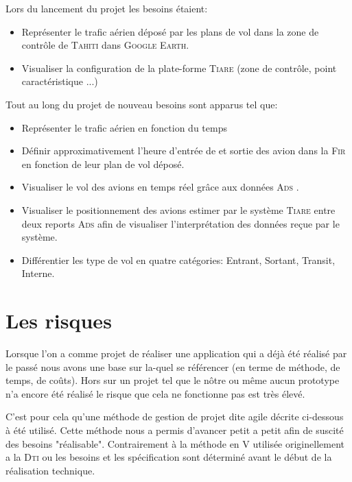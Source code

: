 Lors du lancement du projet les besoins étaient:
\begin{itemize}
    \item Représenter le trafic aérien déposé par les plans de vol dans la zone de contrôle de \textsc{Tahiti} dans \textsc{Google Earth}.
    \item Visualiser la configuration de la plate-forme \textsc{Tiare} (zone de contrôle, point caractéristique ...)
\end{itemize}
Tout au long du projet de nouveau besoins sont apparus tel que:
\begin{itemize}
    \item Représenter le trafic aérien en fonction du temps
    \item Définir approximativement l'heure d'entrée de et sortie des avion dans la \textsc{Fir}  en fonction de leur plan de vol déposé.
    \item Visualiser le vol des avions en temps réel grâce aux données \textsc{Ads} .
    \item Visualiser le positionnement des avions estimer par le système \textsc{Tiare} entre deux reports \textsc{Ads} afin de visualiser l'interprétation des données reçue par le système.
    \item Différentier les type de vol en quatre catégories: Entrant, Sortant, Transit, Interne. 
\end{itemize}

\section{Les risques}
Lorsque l'on a comme projet de réaliser une application qui a déjà été réalisé par le passé nous avons une base sur la-quel se référencer (en terme de méthode, de temps, de coûts). Hors sur un projet tel que le nôtre ou même aucun prototype n'a encore été réalisé le risque que cela ne fonctionne pas est très élevé.

C'est pour cela qu'une méthode de gestion de projet dite agile décrite ci-dessous  à été utilisé. Cette méthode nous a permis d'avancer petit a petit afin de suscité des besoins "réalisable". Contrairement à la méthode en V utilisée originellement a la \textsc{Dti} ou les besoins et les spécification sont déterminé avant le début de la réalisation technique.
